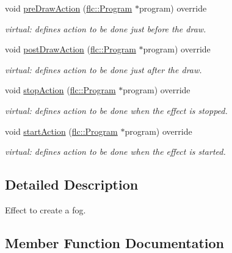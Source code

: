 \begin{DoxyCompactItemize}
\item 
void \hyperlink{classflw_1_1flf_1_1Fog_a0d426e670e2b976601144e28c7dc5a48}{pre\+Draw\+Action} (\hyperlink{classflw_1_1flc_1_1Program}{flc\+::\+Program} $\ast$program) override
\begin{DoxyCompactList}\small\item\em virtual\+: defines action to be done just before the draw. \end{DoxyCompactList}\item 
void \hyperlink{classflw_1_1flf_1_1Fog_a23da383300538478081e23277bcca4fa}{post\+Draw\+Action} (\hyperlink{classflw_1_1flc_1_1Program}{flc\+::\+Program} $\ast$program) override
\begin{DoxyCompactList}\small\item\em virtual\+: defines action to be done just after the draw. \end{DoxyCompactList}\item 
void \hyperlink{classflw_1_1flf_1_1Fog_ab1b33ed568e679c51f24937db7ffd45c}{stop\+Action} (\hyperlink{classflw_1_1flc_1_1Program}{flc\+::\+Program} $\ast$program) override
\begin{DoxyCompactList}\small\item\em virtual\+: defines action to be done when the effect is stopped. \end{DoxyCompactList}\item 
void \hyperlink{classflw_1_1flf_1_1Fog_a12acc2ae25d54721648265aa863c8b1e}{start\+Action} (\hyperlink{classflw_1_1flc_1_1Program}{flc\+::\+Program} $\ast$program) override
\begin{DoxyCompactList}\small\item\em virtual\+: defines action to be done when the effect is started. \end{DoxyCompactList}\end{DoxyCompactItemize}


\subsection{Detailed Description}
Effect to create a fog. 

\subsection{Member Function Documentation}
